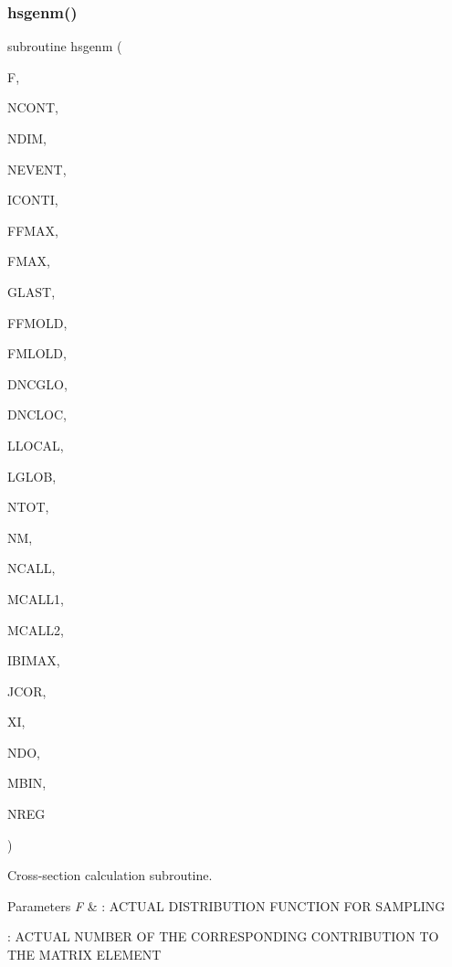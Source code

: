 \mbox{\label{djangoh__h_8f_a88b74428eb7112a650a7b7444915bdbc}} 
\subsubsection{\texorpdfstring{hsgenm()}{hsgenm()}}
{\footnotesize\ttfamily subroutine hsgenm (\begin{DoxyParamCaption}\item[{external}]{F,  }\item[{}]{N\+C\+O\+NT,  }\item[{}]{N\+D\+IM,  }\item[{}]{N\+E\+V\+E\+NT,  }\item[{}]{I\+C\+O\+N\+TI,  }\item[{}]{F\+F\+M\+AX,  }\item[{dimension(nreg)}]{F\+M\+AX,  }\item[{}]{G\+L\+A\+ST,  }\item[{}]{F\+F\+M\+O\+LD,  }\item[{}]{F\+M\+L\+O\+LD,  }\item[{}]{D\+N\+C\+G\+LO,  }\item[{}]{D\+N\+C\+L\+OC,  }\item[{logical}]{L\+L\+O\+C\+AL,  }\item[{logical}]{L\+G\+L\+OB,  }\item[{double precision}]{N\+T\+OT,  }\item[{dimension(nreg)}]{NM,  }\item[{}]{N\+C\+A\+LL,  }\item[{}]{M\+C\+A\+L\+L1,  }\item[{}]{M\+C\+A\+L\+L2,  }\item[{}]{I\+B\+I\+M\+AX,  }\item[{}]{J\+C\+OR,  }\item[{dimension(ndo,ndim)}]{XI,  }\item[{}]{N\+DO,  }\item[{}]{M\+B\+IN,  }\item[{}]{N\+R\+EG }\end{DoxyParamCaption})}



Cross-\/section calculation subroutine. 


\begin{DoxyParams}{Parameters}
{\em F} & \+: A\+C\+T\+U\+AL D\+I\+S\+T\+R\+I\+B\+U\+T\+I\+ON F\+U\+N\+C\+T\+I\+ON F\+OR S\+A\+M\+P\+L\+I\+NG\\
\hline
\end{DoxyParams}
\+: A\+C\+T\+U\+AL N\+U\+M\+B\+ER OF T\+HE C\+O\+R\+R\+E\+S\+P\+O\+N\+D\+I\+NG C\+O\+N\+T\+R\+I\+B\+U\+T\+I\+ON TO T\+HE M\+A\+T\+R\+IX E\+L\+E\+M\+E\+NT


